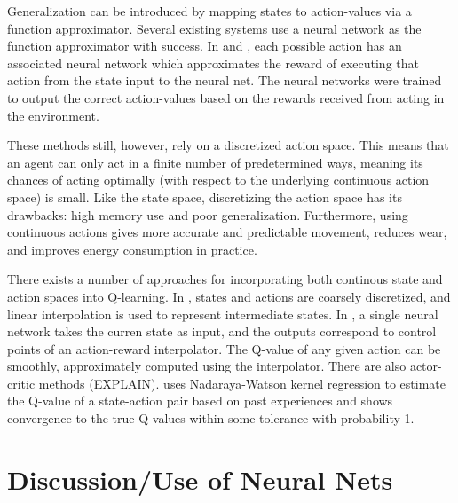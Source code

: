 \documentclass{article} %
\begin{document}
Generalization can be introduced by mapping states to action-values via a function approximator.  Several existing systems use a neural network as the function approximator \cite{lin} \cite{deep_rl} \cite{gaskett_thesis} with success. In \cite{lin} and \cite{deep_rl}, each possible action has an associated neural network which approximates the reward of executing that action from the state input to the neural net.  The neural networks were trained to output the correct action-values based on the rewards received from acting in the environment.  

These methods still, however, rely on a discretized action space.  This means that an agent can only act in a finite number of predetermined ways, meaning its chances of acting optimally (with respect to the underlying continuous action space) is small.  Like the state space, discretizing the action space has its drawbacks: high memory use and poor generalization.  Furthermore, using continuous actions gives more accurate and predictable movement, reduces wear, and improves energy consumption in practice\cite{gaskett_thesis}. 

There exists a number of approaches for incorporating both continous state and action spaces into Q-learning.  In \cite{takahashi}, states and actions are coarsely discretized, and linear interpolation is used to represent intermediate states.  In \cite{gaskett_thesis}, a single neural network takes the curren state as input, and the outputs correspond to control points of an action-reward interpolator.  The Q-value of any given action can be smoothly, approximately computed using the interpolator. There are also actor-critic methods (EXPLAIN).  \cite{carden2014} uses Nadaraya-Watson kernel regression \cite{nadaraya} to estimate the Q-value of a state-action pair based on past experiences and shows convergence to the true Q-values within some tolerance with probability 1.  

\section{Discussion/Use of Neural Nets}
\end{document}
